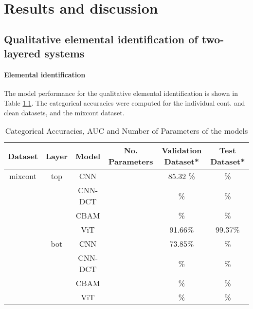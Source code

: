 


\chapter{Results and discussion} %

\label{Chapter4}



\section{Qualitative elemental identification of two-layered systems}
\subsubsection{Elemental identification}
The model performance for the qualitative elemental identification is shown in Table \ref{tab:acc_qual}. The categorical accuracies were computed for the individual cont. and clean datasets, and the mixcont dataset.

\begin{table}[H]
    \centering
    \begin{tabular}{c|c|c|c|c|c}
        Dataset & Layer & Model   & No. Parameters & Validation Dataset*  & Test Dataset*    \\
        \hline
        mixcont & top   & CNN     &                & 85.32 \%              &        \% \\
                &       & CNN-DCT &                &       \%              &         \% \\
                &       & CBAM    &                &       \%              &         \% \\
                &       & ViT     &                &  91.66\%              &   99.37\% \\
                & bot   & CNN     &                &  73.85\%              &          \%  \\
                &       & CNN-DCT &                &       \%              &          \%  \\
                &       & CBAM    &                &       \%              &         \% \\
                &       & ViT     &                &       \%              &           \% \\
    \end{tabular}
    \caption{Categorical Accuracies, AUC and Number of Parameters of the models}
    \label{tab:acc_qual}
\end{table}


